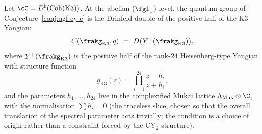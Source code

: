 \begin{conjecture}
\label{conj:cy-c-k3-abelian}
Let $\cC = D^b(\mathrm{Coh}(\mathrm{K3}))$. At the abelian ($\fgl_1$) level, the quantum group of Conjecture~\ref{conj:qgf-cy-c} is the Drinfeld double of the positive half of the K3 Yangian:
\begin{equation}
 C(\frakg_{\mathrm{K3}}, q) \ = \ D\bigl(Y^+(\frakg_{\mathrm{K3}})\bigr),
 \label{eq:cy-c-k3-abelian}
\end{equation}
where $Y^+(\frakg_{\mathrm{K3}})$ is the positive half of the rank-$24$ Heisenberg-type Yangian with structure function
\begin{equation}
 g_{\mathrm{K3}}(z) = \prod_{i=1}^{24} \frac{z - h_i}{z + h_i},
 \label{eq:cy-c-structure-fn}
\end{equation}
and the parameters $h_1, \ldots, h_{24}$ live in the complexified Mukai lattice $\Lambda_{\mathrm{Muk}} \otimes \C$, with the normalisation $\sum h_i = 0$ (the traceless slice, chosen so that the overall translation of the spectral parameter acts trivially; the condition is a choice of origin rather than a constraint forced by the CY$_2$ structure).
\end{conjecture}

